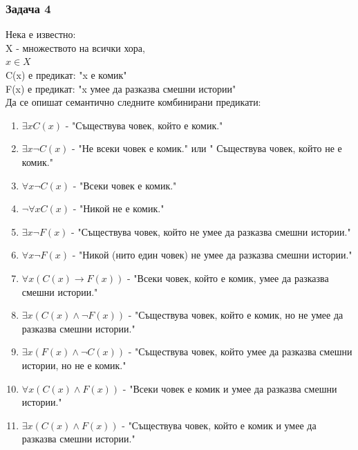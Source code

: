 \documentclass[fleqn, 12pt]{article}
\theoremstyle{definition}
\begin{document}
\subsubsection*{Задача 4}
Нека е известно: \\
X -  множеството на всички хора, \\
$x \in X$\\
C(x) е предикат: "x е комик" \\
F(x) е предикат:  "x умее да разказва смешни истории" \\
Да се опишат семантично следните комбинирани предикати:
\begin{enumerate}
\item $\exists x C(x)$ - "Съществува човек, който е комик."
\item $\exists x \neg C(x)$ - "Не всеки човек е комик." или " Съществува човек, който не е комик."
\item $\forall x \neg C(x)$ - "Всеки човек е комик."
\item $\neg \forall x C(x)$ - "Никой не е комик."
\item $\exists x \neg F(x)$ - "Съществува човек, който не умее да разказва смешни истории."
\item $\forall x \neg F(x)$ - "Никой (нито един човек) не умее да разказва смешни истории."
\item $\forall x (C(x) \to F(x))$ - "Всеки  човек, който  е  комик, умее  да  разказва  смешни истории."
\item $\exists x (C(x) \land \neg F(x))$ - "Съществува човек, който е комик, но не умее да разказва смешни истории."
\item $\exists x (F(x) \land \neg C(x))$ - "Съществува човек, който умее да разказва смешни истории, но не е комик."
\item $\forall x (C(x) \land F(x))$ - "Всеки човек е комик и умее да разказва смешни истории."
\item $\exists x (C(x) \land F(x))$ - "Съществува човек, който е комик и умее да разказва смешни истории."
\end{enumerate}
\end{document}
